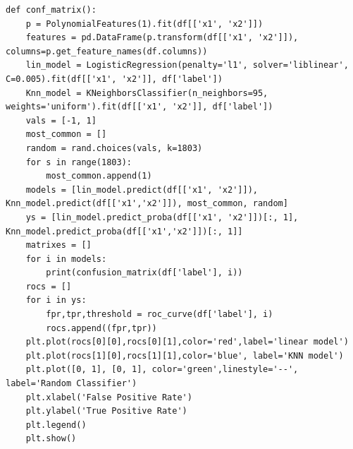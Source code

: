 \documentclass[11pt]{article} %
\begin{document}
\begin{verbatim}
def conf_matrix():
    p = PolynomialFeatures(1).fit(df[['x1', 'x2']])
    features = pd.DataFrame(p.transform(df[['x1', 'x2']]), columns=p.get_feature_names(df.columns))
    lin_model = LogisticRegression(penalty='l1', solver='liblinear', C=0.005).fit(df[['x1', 'x2']], df['label'])
    Knn_model = KNeighborsClassifier(n_neighbors=95, weights='uniform').fit(df[['x1', 'x2']], df['label'])
    vals = [-1, 1]
    most_common = []
    random = rand.choices(vals, k=1803)
    for s in range(1803):
        most_common.append(1)
    models = [lin_model.predict(df[['x1', 'x2']]), Knn_model.predict(df[['x1','x2']]), most_common, random]
    ys = [lin_model.predict_proba(df[['x1', 'x2']])[:, 1], Knn_model.predict_proba(df[['x1','x2']])[:, 1]]
    matrixes = []
    for i in models:
        print(confusion_matrix(df['label'], i))
    rocs = []
    for i in ys:
        fpr,tpr,threshold = roc_curve(df['label'], i)
        rocs.append((fpr,tpr))
    plt.plot(rocs[0][0],rocs[0][1],color='red',label='linear model')
    plt.plot(rocs[1][0],rocs[1][1],color='blue', label='KNN model')
    plt.plot([0, 1], [0, 1], color='green',linestyle='--', label='Random Classifier')
    plt.xlabel('False Positive Rate')
    plt.ylabel('True Positive Rate')
    plt.legend()
    plt.show()

\end{verbatim}
\end{document}
